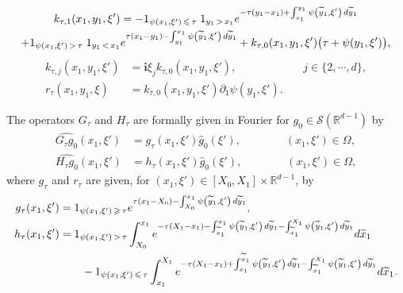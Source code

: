 \documentclass[10pt]{amsart}
\theoremstyle{definition}\newtheorem{defi}[theo]{Definition}\newtheorem{rema}[theo]{Remark}\newtheorem{exam}[theo]{Example}\newtheorem{exem}[theo]{Example}\newtheorem{nota}[theo]{Notation}
\newcommand{\scS}{\mathscr{S}}
\newcommand*\R{\mathbb{R}}
\renewcommand{\i}{\mathbf{i}}
\renewcommand{\leq}{\leqslant}
\renewcommand{\geq}{\geqslant}
\renewcommand{\tilde}{\widetilde}
\let\oldtilde\tilde
\renewcommand*{\tilde}[1]{\mathchoice{\widetilde{#1}}{\widetilde{#1}}{\oldtilde{#1}}{\oldtilde{#1}}}
\begin{document}
\begin{prop}
\begin{multline}
\end{multline}
\begin{multline}\label{Def-k-tau-1-x1-y1-xi'}
k_{\tau,1} (x_1,y_1, \xi') = - 1_{\psi(x_1, \xi')\, \leq\,\tau}\; 1_{y_1\,>\,x_1} e^{-\tau(y_1-x_1)+\int_{x_1}^{y_1} \psi\left(\tilde{y}_1,\xi'\right) \, d \tilde{y}_1}
\\
+ 1_{\psi(x_1,\xi')\,>\,\tau}\; 1_{y_1\,<\,x_1} e^{\tau(x_1-y_1) - \int_{y_1}^{x_1} \psi\left(\tilde{y}_1,\xi'\right) \, d \tilde{y}_1} + k_{\tau,0}(x_1,y_1,\xi') \big(\tau + \psi(y_1,\xi')\big),
\end{multline}
\begin{equation}\label{Def-k-tau-j-x1-y1-xi'}
\begin{split}
k_{\tau,j}(x_1, y_1, \xi') & = \i \xi_j k_{\tau,0}(x_1,y_1, \xi'), \qquad\qquad \qquad j \in \{2, \cdots, d\},
\\
r_\tau(x_1,y_1, \xi) & = k_{\tau, 0}(x_1,y_1, \xi') \partial_1 \psi(y_1,\xi').
\end{split} 
\end{equation}

The operators $G_\tau$ and $H_\tau$ are formally given in Fourier for $g_0 \in \scS(\R^{d-1})$ by
\begin{equation}\label{Def-G-tau-Fourier}
\begin{aligned}
\widehat {G_{\tau} g_0}(x_1, \xi') & = g_{\tau}(x_1, \xi') \widehat g_0(\xi'),
\qquad \qquad(x_1, \xi') \in \Omega,
\\
\widehat {H_{\tau} g_0}(x_1, \xi') & = h_\tau(x_1, \xi') \widehat g_0(\xi'),
\qquad \qquad(x_1, \xi') \in \Omega,
\end{aligned}
\end{equation}
where $g_\tau$ and $r_\tau$ are given, for $(x_1, \xi') \in [X_0,X_1] \times \R^{d-1}$, by
\begin{equation}\label{Def-g-tau-x1-xi'}
\begin{split}
g_{\tau}(x_1, \xi') & = 1_{\psi(x_1,\xi')\, \geq\,\tau} e^{\tau (x_1-X_0)- \int_{X_0}^{x_1} \psi\left(\tilde{y}_1, \xi'\right) \, d \tilde{y}_1 },
\\
h_\tau(x_1,\xi') & = 1_{\psi(x_1,\xi')\,>\,\tau} \int_{X_0}^{x_1} e^{-\tau(X_1-x_1) - \int_{\tilde x_1}^{x_1} \psi\left(\tilde y_1, \xi'\right) \, d\tilde y_1 - \int_{\tilde x_1}^{X_1} \psi\left(\tilde y_1, \xi'\right) \, d\tilde y_1 } d\tilde x_1
\\
& \qquad - 1_{\psi(x_1,\xi')\,\leq\,\tau} \int_{x_1}^{X_1} e^{-\tau(X_1-x_1) +\int_{x_1}^{\tilde x_1} \psi\left(\tilde y_1, \xi'\right) \, d\tilde y_1 - \int_{\tilde x_1}^{X_1} \psi\left(\tilde y_1, \xi'\right) \, d\tilde y_1} d\tilde x_1.
\end{split}
\end{equation}
\end{prop}
\end{document}
